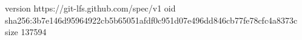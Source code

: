 version https://git-lfs.github.com/spec/v1
oid sha256:3b7e146d95964922cb5b65051afdf0c951d07e496dd846cb77fe78cfc4a8373c
size 137594
